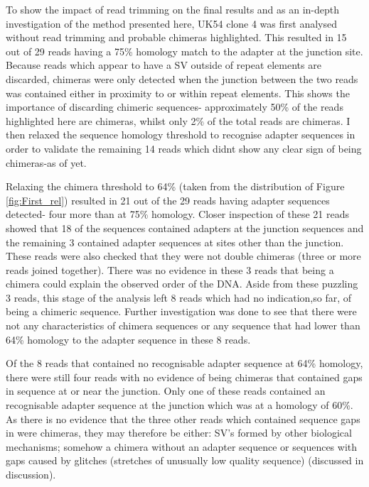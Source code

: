 To show the impact of read trimming on the final results and as an in-depth investigation of the method presented here, UK54 clone 4 was first analysed without read trimming and probable chimeras highlighted. This resulted in 15 out of 29 reads having a 75\% homology match to the adapter at the junction site. Because reads which appear to have a SV outside of repeat elements are discarded, chimeras were only detected when the junction between the two reads was contained either in proximity to or within repeat elements. This shows the importance of discarding chimeric sequences- approximately 50\% of the reads highlighted here are chimeras, whilst only 2\% of the total reads are chimeras. I then relaxed the sequence homology threshold to recognise adapter sequences in order to validate the remaining 14 reads which didnt show any clear sign of being chimeras-as of yet.

Relaxing the chimera threshold to 64\% (taken from the distribution of Figure \ref{fig:First_rel}) resulted in 21 out of the 29 reads having adapter sequences detected- four more than at 75\% homology. Closer inspection of these 21 reads showed that 18 of the sequences contained adapters at the junction sequences and  the remaining 3 contained adapter sequences at sites other than the junction. These reads were also checked that they were not double chimeras (three or more reads joined together). There was no evidence in these 3 reads that being a chimera could explain the observed order of the DNA. Aside from these puzzling 3 reads, this stage of the analysis left 8 reads which had no indication,so far, of being a chimeric sequence. Further investigation was done to see that there were not any characteristics of chimera sequences or any sequence that had lower than 64\% homology to the adapter sequence in these 8 reads.


Of the 8 reads that contained no recognisable adapter sequence at 64\% homology, there were still four reads with no evidence of being chimeras that contained gaps in sequence at or near the junction. Only one of these reads contained an recognisable adapter sequence at the junction which was at a homology of 60\%. As there is no evidence that the three other reads which contained sequence gaps in were chimeras, they may therefore be either: SV's formed by other biological mechanisms; somehow a chimera without an adapter sequence or sequences with gaps caused by glitches (stretches of unusually low quality sequence) (discussed in discussion). 


